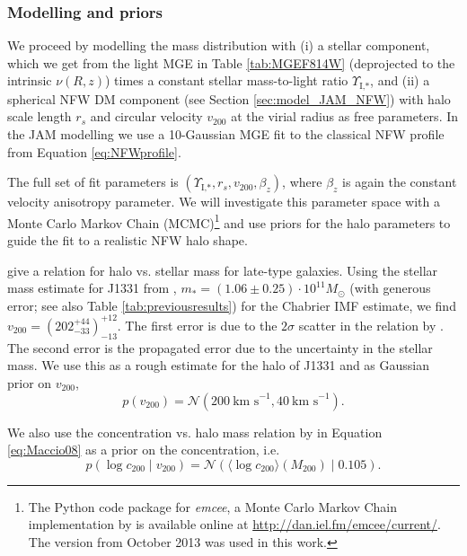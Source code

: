 \documentclass[useAMS,usenatbib]{mnras}
\begin{document}
\subsubsection{Modelling and priors}

We proceed by modelling the mass distribution with (i) a stellar component, which we get from the light MGE in Table \ref{tab:MGEF814W} (deprojected to the intrinsic $\nu(R,z)$) times a constant stellar mass-to-light ratio $\Upsilon_\text{I,*}$, and (ii) a spherical NFW DM component (see Section \ref{sec:model_JAM_NFW}) with halo scale length $r_s$ and circular velocity $v_{200}$ at the virial radius as free parameters. In the JAM modelling we use a 10-Gaussian MGE fit to the classical NFW profile from Equation \eqref{eq:NFWprofile}.

The full set of fit parameters is $(\Upsilon_\text{I,*},r_s,v_{200},\beta_z)$, where $\beta_z$ is again the constant velocity anisotropy parameter. We will investigate this parameter space with a Monte Carlo Markov Chain (MCMC)\footnote{The Python code package for \emph{emcee}, a Monte Carlo Markov Chain implementation by \citet{emcee} is available online at \url{http://dan.iel.fm/emcee/current/}. The version from October 2013 was used in this work.} \citep{emcee} and use priors for the halo parameters to guide the fit to a realistic NFW halo shape.

\citet{Dutton10} give a relation for halo vs. stellar mass for late-type galaxies. Using the stellar mass estimate for J1331 from \citet{SWELLSI}, $m_* = (1.06 \pm 0.25) \cdot 10^{11} M_\odot$ (with generous error; see also Table \ref{tab:previousresults}) for the Chabrier IMF estimate, we find ${v_{200}} = (202_{-33}^{+44})_{-13}^{+12}$. The first error is due to the $2\sigma$ scatter in the relation by \citet{Dutton10}. The second error is the propagated error due to the uncertainty in the stellar mass. We use this as a rough estimate for the halo of J1331 and as Gaussian prior on $v_{200}$, 
\begin{equation}
p(v_{200}) = \mathscr{N}(200~\text{km s}^{-1},40~\text{km s}^{-1}). \label{eq:prior_v200}
\end{equation}

We also use the concentration vs. halo mass relation by \citet{Maccio08} in Equation \eqref{eq:Maccio08} as a prior on the concentration, i.e.
\begin{equation}
p(\log c_{200} \mid v_{200}) = \mathscr{N}\left(\langle \log c_{200} \rangle (M_{200}) \mid 0.105 \right). \label{eq:prior_c200}
\end{equation}
\end{document}
